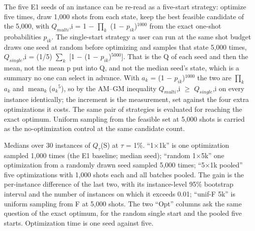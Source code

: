 \documentclass[journal]{IEEEtran}
\begin{document}
The five E1 seeds of an instance can be re-read as a five-start strategy: optimize five times, draw 1,000 shots from each state, keep the best feasible candidate of the 5,000, with $Q_{multi}$,i = 1 $-$ $\prod_{k}$ (1 $-$ $p_{ik}$)$^{1000}$ from the exact one-shot probabilities $p_{ik}$. The single-start strategy a user can run at the same shot budget draws one seed at random before optimizing and samples that state 5,000 times, $Q_{single}$,i = (1/5) $\sum_{k}$ [1 $-$ (1 $-$ $p_{ik}$)$^{5000}$]. That is the Q of each seed and then the mean, not the mean p put into Q, and not the median seed's state, which is a summary no one can select in advance. With $a_{k}$ = (1 $-$ $p_{ik}$)$^{1000}$ the two are $\prod_{k}$ $a_{k}$ and $\operatorname{mean}_{k}$($a_{k}$$^{5}$), so by the AM--GM inequality $Q_{multi}$,i $\geq$ $Q_{single}$,i on every instance identically; the increment is the measurement, set against the four extra optimizations it costs. The same pair of strategies is evaluated for reaching the exact optimum. Uniform sampling from the feasible set at 5,000 shots is carried as the no-optimization control at the same candidate count.


Medians over 30 instances of $Q_{\tau}$(S) at $\tau$ = 1\%. ``1$\times$1k'' is one optimization sampled 1,000 times (the E1 baseline; median seed); ``random 1$\times$5k'' one optimization from a randomly drawn seed sampled 5,000 times; ``5$\times$1k pooled'' five optimizations with 1,000 shots each and all batches pooled. The gain is the per-instance difference of the last two, with its instance-level 95\% bootstrap interval and the number of instances on which it exceeds 0.01; ``unif-F 5k'' is uniform sampling from F at 5,000 shots. The two ``Opt'' columns ask the same question of the exact optimum, for the random single start and the pooled five starts. Optimization time is one seed against five.
\end{document}
